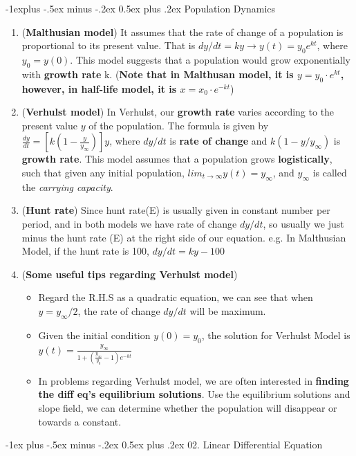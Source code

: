 \documentclass[10pt, landscape]{article}
\makeatletter
\renewcommand{\section}{\@startsection{section}{1}{0mm}%
                                {-1ex plus -.5ex minus -.2ex}%
                                {0.5ex plus .2ex}%
                                {\normalfont\large\bfseries}}
\renewcommand{\subsection}{\@startsection{subsection}{2}{0mm}%
                                {-1explus -.5ex minus -.2ex}%
                                {0.5ex plus .2ex}%
                                {\normalfont\normalsize\bfseries}}
\makeatother
\begin{document}
\begin{multicols}{4}
\subsection{Population Dynamics}
\begin{enumerate}
    \item (\textbf{Malthusian model}) It assumes that the rate of change of a population is proportional to its present value. That is $dy/dt=ky\rightarrow y(t)=y_0e^{kt}$, where $y_0=y(0)$. This model suggests that a population would grow exponentially with \textbf{growth rate} k. (\textbf{Note that in Malthusan model, it is $y=y_0\cdot e^{kt}$, however, in half-life model, it is $x=x_0\cdot e^{-kt}$})
    \item (\textbf{Verhulst model}) In Verhulst, our \textbf{growth rate} varies according to the present value $y$ of the population. The formula is given by $\frac{dy}{dt}=[k(1-\frac{y}{y_\infty})]y$, where $dy/dt$ is \textbf{rate of change} and $k(1-y/y_\infty)$ is \textbf{growth rate}. This model assumes that a population grows \textbf{logistically}, such that given any initial population, $lim_{t\to \infty}y(t)=y_\infty$, and $y_\infty$ is called the \textit{carrying capacity}.
    \item (\textbf{Hunt rate}) Since hunt rate(E) is usually given in constant number per period, and in both models we have rate of change $dy/dt$, so usually we just minus the hunt rate (E) at the right side of our equation. e.g. In Malthusian Model, if the hunt rate is 100, $dy/dt=ky-100$
    \item (\textbf{Some useful tips regarding Verhulst model})
    \begin{itemize}
        \item Regard the R.H.S as a quadratic equation, we can see that when $y=y_\infty/2$, the rate of change $dy/dt$ will be maximum.
        \item Given the initial condition $y(0)=y_0$, the solution for Verhulst Model is $y(t)=\frac{y_\infty}{1+(\frac{y_\infty}{y_0}-1)e^{-kt}}$
        \item In problems regarding Verhulst model, we are often interested in \textbf{finding the diff eq's equilibrium solutions}. Use the equilibrium solutions and slope field, we can determine whether the population will disappear or towards a constant.
    \end{itemize}
\end{enumerate}

\section{02. Linear Differential Equation}

\end{multicols}
\end{document}

